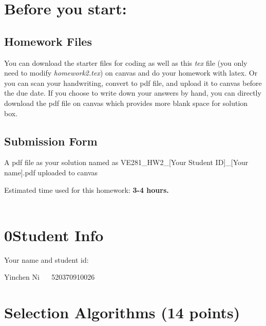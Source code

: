 \documentclass[11pt]{exam}
\begin{document}
\setlength{\parindent}{0pt}
\section*{Before you start:}

\subsection*{Homework Files}
You can download the starter files for coding as well as this \textit{tex} file (you only need to modify \textit{homework2.tex}) on canvas and do your homework with latex. Or you can scan your handwriting, convert to pdf file, and upload it to canvas before the due date. If you choose to write down your answers by hand, you can directly download the pdf file on canvas which provides more blank space for solution box.\\

\subsection*{Submission Form}
A pdf file as your solution named as VE281\_HW2\_[Your Student ID]\_[Your name].pdf uploaded to canvas


Estimated time used for this homework: \textbf{3-4 hours.}
\\\\


\newpage
\section*{0\quad Student Info}
Your name and student id:
\begin{solution}
Yinchen Ni ~~ 520370910026
\end{solution}

\section{Selection Algorithms (14 points)}
\end{document}
